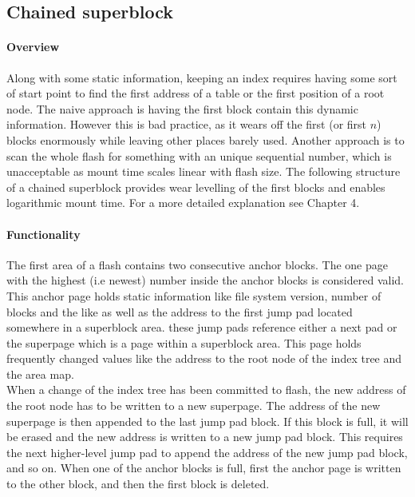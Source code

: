 \subsection{Chained superblock}
\label{sub:chainedSB}
\paragraph{Overview}
Along with some static information, keeping an index requires having some sort of start point to find the first address of a table or the first position of a root node. The naive approach is having the first block contain this dynamic information. However this is bad practice, as it wears off the first (or first $n$) blocks enormously while leaving other places barely used. Another approach is to scan the whole flash for something with an unique sequential number, which is unacceptable as mount time scales linear with flash size.
The following structure of a chained superblock provides wear levelling of the first blocks and enables logarithmic mount time.
For a more detailed explanation see  Chapter 4.

\paragraph{Functionality}
The first area of a flash contains two consecutive anchor blocks. The one page with the highest (i.e newest) number inside the anchor blocks is considered valid. This anchor page holds static information like file system version, number of blocks and the like as well as the address to the first jump pad located somewhere in a superblock area. these jump pads reference either a next pad or the superpage which is a page within a superblock area. This page holds frequently changed values like the address to the root node of the index tree and the area map.\\

When a change of the index tree has been committed to flash, the new address of the root node has to be written to a new superpage. The address of the new superpage is then appended to the last jump pad block. If this block is full, it will be erased and the new address is written to a new jump pad block. This requires the next higher-level jump pad to append the address of the new jump pad block, and so on. When one of the anchor blocks is full, first the anchor page is written to the other block, and then the first block is deleted.\\




